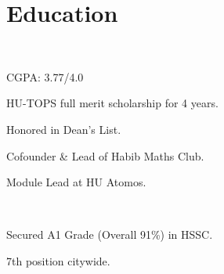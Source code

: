 \documentclass[]{resume}
\begin{document}
\begin{minipage}[t]{0.5\textwidth}

    \section{Education}
     \\
    \begin{tightemize}
        \sectionsep
        \item CGPA: 3.77/4.0
        \item HU-TOPS full merit scholarship for 4 years.
        \item Honored in Dean's List.
        \item Cofounder \& Lead of Habib Maths Club.
        \item Module Lead at HU Atomos.
    \end{tightemize}

    \sectionsep

    \\
    \begin{tightemize}
        \item Secured A1 Grade (Overall 91\%) in HSSC.
        \item 7th position citywide.
    \end{tightemize}


\end{minipage}
\end{document}
